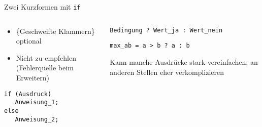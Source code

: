 
\begin{frame}[fragile]{Zwei Kurzformen mit \texttt{if}}
%
\begin{columns}[T]
\begin{tcolorbox}[title=\emph{Einzeilige} \texttt{if}-Blöcke]
\begin{itemize}
\item \{Geschweifte Klammern\} optional
\item Nicht zu empfehlen\newline
	(Fehlerquelle beim Erweitern)
\end{itemize}
\begin{codebox}
\begin{verbatim}
if (Ausdruck)
   Anweisung_1;
else
   Anweisung_2;
\end{verbatim}
\end{codebox}
\end{tcolorbox}
%
\begin{tcolorbox}[title=Bedingte Zuweisung]
%
\begin{codebox}[Syntax]
\scriptsize\texttt{Bedingung ? Wert_ja : Wert_nein}
\end{codebox}
\begin{codebox}[Beispiel]
\scriptsize\texttt{max_ab = a > b  ?  a  :  b}
\end{codebox}
Kann manche Ausdrücke stark vereinfachen, an anderen Stellen eher verkomplizieren
\end{tcolorbox}
%
\end{columns}
%
\end{frame}



